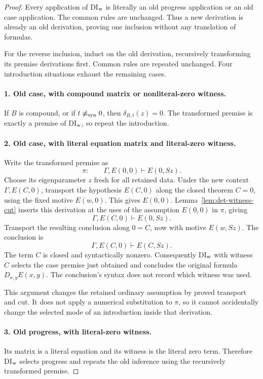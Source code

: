 \documentclass[11pt,letterpaper]{article}
\theoremstyle{definition}\newtheorem{definition}[theorem]{Definition}
\theoremstyle{remark}\newtheorem{remark}[theorem]{Remark}
\begin{document}
\begin{proof}
Every application of DI$_{\rm w}$ is literally an old progress
application or an old case application.  The common rules are
unchanged.  Thus a new derivation is already an old derivation, proving
one inclusion without any translation of formulas.

For the reverse inclusion, induct on the old derivation, recursively
transforming its premise derivations first.  Common rules are repeated
unchanged.  Four introduction situations exhaust the remaining cases.

\paragraph{1. Old case, with compound matrix or nonliteral-zero witness.}
If $B$ is compound, or if $t\not\equiv_{\rm syn}0$, then
$\delta_{B,t}(z)=0$.  The transformed premise is exactly a premise of
DI$_{\rm w}$, so repeat the introduction.

\paragraph{2. Old case, with literal equation matrix and literal-zero
witness.}
Write the transformed premise as
\[
 \pi:\qquad\Gamma,E(0,0)\vdash E(0,Sz).
\]
Choose its eigenparameter $z$ fresh for all retained data.  Under the
new context $\Gamma,E(C,0)$, transport the hypothesis $E(C,0)$ along
the closed theorem $C=0$, using the fixed motive $E(w,0)$.  This gives
$E(0,0)$.  Lemma~\ref{lem:det-witness-cut} inserts this derivation
at the uses of the assumption $E(0,0)$ in $\pi$, giving
\[
                 \Gamma,E(C,0)\vdash E(0,Sz).
\]
Transport the resulting conclusion along $0=C$, now with motive
$E(w,Sz)$.  The conclusion is
\[
                 \Gamma,E(C,0)\vdash E(C,Sz).
\]
The term $C$ is closed and syntactically nonzero.  Consequently
DI$_{\rm w}$ with witness $C$ selects the case premise just obtained
and concludes the original formula $D_{x,y}E(x,y)$.  The conclusion's
syntax does not record which witness was used.

This argument changes the retained ordinary assumption by proved
transport and cut.  It does not apply a numerical substitution to
$\pi$, so it cannot accidentally change the selected mode of an
introduction inside that derivation.

\paragraph{3. Old progress, with literal-zero witness.}
Its matrix is a literal equation and its witness is the literal zero
term.  Therefore DI$_{\rm w}$ selects progress and repeats the old
inference using the recursively transformed premise.


\end{proof}
\end{document}
